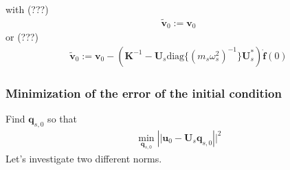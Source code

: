 \documentclass[letterpaper,10pt,english]{jupyterBook}
\begin{document}
\sphinxAtStartPar
{}  with (???)
\begin{equation*}
\begin{split}\widetilde{\mathbf{v}}_0 := \mathbf{v}_0 \end{split}
\end{equation*}
\sphinxAtStartPar
or (???)
\begin{equation*}
\begin{split}\widetilde{\mathbf{v}}_0 := \mathbf{v}_0 - \left( \mathbf{K}^{-1} - \mathbf{U}_s \text{diag}\{ (m_s \omega_s^2)^{-1} \} \mathbf{U}^*_s  \right) \dot{\mathbf{f}}(0)\end{split}
\end{equation*}\subsubsection*{Minimization of the error of the initial condition}

\sphinxAtStartPar
Find \(\mathbf{q}_{s,0}\) so that
\begin{equation*}
\begin{split}\min_{\mathbf{q}_{s,0}} \left|| \mathbf{u}_0 - \mathbf{U}_s \mathbf{q}_{s,0} \right||^2\end{split}
\end{equation*}
\sphinxAtStartPar
Let’s investigate two different norms.
\end{document}
